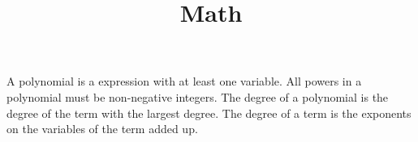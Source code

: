 \documentclass[12pt, letterpaper, twoside]{article}
\title{Math}
\begin{document}
	
	\maketitle

A polynomial is a expression with at least one variable. All powers in a polynomial must be non-negative integers. The degree of a polynomial is the degree of the term with the largest degree. The degree of a term is the exponents on the variables of the term added up.
	 
	
\end{document}
